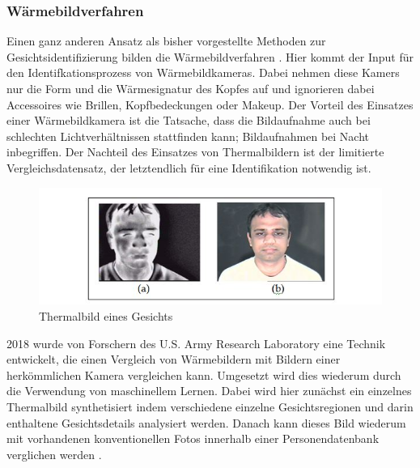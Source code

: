 \documentclass[doktyp=semarbeit, sprache=german]{TUBAFarbeiten}
\begin{document}
\subsubsection{Wärmebildverfahren}
Einen ganz anderen Ansatz als bisher vorgestellte Methoden zur Gesichtsidentifizierung bilden die Wärmebildverfahren \cite{Thermal}. Hier kommt der Input für den Identifkationsprozess von Wärmebildkameras. Dabei nehmen diese Kamers nur die Form und die Wärmesignatur des Kopfes auf und ignorieren dabei Accessoires wie Brillen, Kopfbedeckungen oder Makeup. Der Vorteil des Einsatzes einer Wärmebildkamera ist die Tatsache, dass die Bildaufnahme auch bei schlechten Lichtverhältnissen stattfinden kann; Bildaufnahmen bei Nacht inbegriffen. Der Nachteil des Einsatzes von Thermalbildern ist der limitierte Vergleichsdatensatz, der letztendlich für eine Identifikation notwendig ist.
\begin{figure}
	\centering
	\includegraphics[width=1\textwidth]{images/thermal}
	\caption{Thermalbild eines Gesichts \cite{Thermal}}
	\label{img:thermal}
\end{figure}
2018 wurde von Forschern des U.S. Army Research Laboratory eine Technik entwickelt, die einen Vergleich von Wärmebildern mit Bildern einer herkömmlichen Kamera vergleichen kann. Umgesetzt wird dies wiederum durch die Verwendung von maschinellem Lernen. Dabei wird hier zunächst ein einzelnes Thermalbild synthetisiert indem verschiedene einzelne Gesichtsregionen und darin enthaltene Gesichtsdetails analysiert werden. Danach kann dieses Bild wiederum mit vorhandenen konventionellen Fotos innerhalb einer Personendatenbank verglichen werden \cite{Army}.
\end{document}
